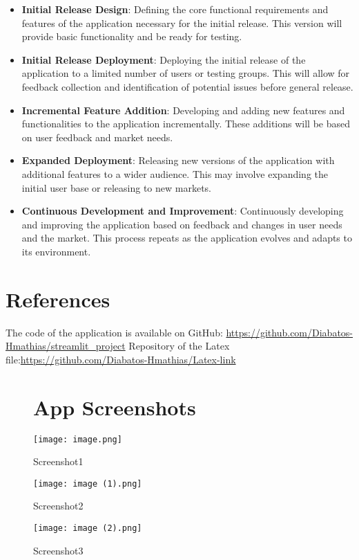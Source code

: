 \documentclass{article}
\begin{document}
\begin{itemize}
\item \textbf{Initial Release Design}:
Defining the core functional requirements and features of the application necessary for the initial release. This version will provide basic functionality and be ready for testing.

\item \textbf{Initial Release Deployment}:
Deploying the initial release of the application to a limited number of users or testing groups. This will allow for feedback collection and identification of potential issues before general release.

\item \textbf{Incremental Feature Addition}:
Developing and adding new features and functionalities to the application incrementally. These additions will be based on user feedback and market needs.

\item \textbf{Expanded Deployment}:
Releasing new versions of the application with additional features to a wider audience. This may involve expanding the initial user base or releasing to new markets.

\item \textbf{Continuous Development and Improvement}:
Continuously developing and improving the application based on feedback and changes in user needs and the market. This process repeats as the application evolves and adapts to its environment.
\end{itemize}


\section{References}
The code of the application is available on GitHub: \url{https://github.com/Diabatos-Hmathias/streamlit_project}
Repository of the Latex file:\url{https://github.com/Diabatos-Hmathias/Latex-link}

\begin{figure}
    
    \section{App Screenshots}
    
    \centering
    \texttt{[image: image.png]}
    \caption{Screenshot1}
    
    \centering
    \texttt{[image: image (1).png]}
    \caption{Screenshot2}

    \centering
    \texttt{[image: image (2).png]}
    \caption{Screenshot3}

    \label{fig:example}

\end{figure}
\end{document}
